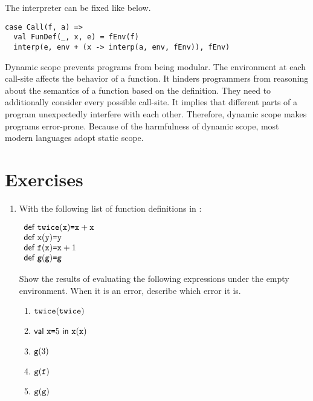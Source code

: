 The interpreter can be fixed like below.

\begin{verbatim}
case Call(f, a) =>
  val FunDef(_, x, e) = fEnv(f)
  interp(e, env + (x -> interp(a, env, fEnv)), fEnv)
\end{verbatim}

Dynamic scope prevents programs from being modular. The environment at each call-site
affects the behavior of a function. It hinders programmers from reasoning about
the semantics of a function based on the definition. They need to additionally consider
every possible call-site. It implies that different parts of a program unexpectedly
interfere with each other. Therefore, dynamic scope makes programs error-prone.
Because of the harmfulness of dynamic scope, most modern languages adopt static
scope.

\section{Exercises}

\begin{enumerate}
\item With the following list of function definitions in \lang:

$
\begin{array}{l}
  \textsf{def}\ \texttt{twice}(\texttt{x})\texttt{=}\texttt{x}+\texttt{x} \\
  \textsf{def}\ \texttt{x}(\texttt{y})\texttt{=}\texttt{y} \\
  \textsf{def}\ \texttt{f}(\texttt{x})\texttt{=}\texttt{x}+1 \\
  \textsf{def}\ \texttt{g}(\texttt{g})\texttt{=}\texttt{g} \\
\end{array}
$

Show the results of evaluating the following expressions under the empty environment.
When it is an error, describe which error it is.
\begin{enumerate}
  \item $\texttt{twice}(\texttt{twice})$
  \item $\textsf{val}\ \texttt{x}\texttt{=}5\ \textsf{in}\ \texttt{x}(\texttt{x})$
  \item $\texttt{g}(3)$
  \item $\texttt{g}(\texttt{f})$
  \item $\texttt{g}(\texttt{g})$
\end{enumerate}
\end{enumerate}
